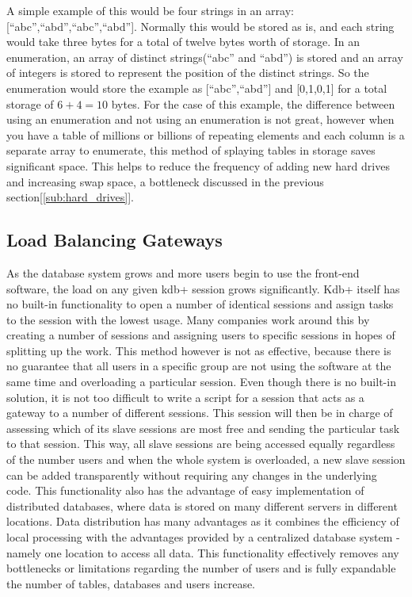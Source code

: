 A simple example of this would be four strings in an array: [``abc'',``abd'',``abc'',``abd''].  Normally this would be stored as is, and each string would take three bytes for a total of twelve bytes worth of storage.  In an enumeration, an array of distinct strings(``abc'' and ``abd'') is stored and an array of integers is stored to represent the position of the distinct strings.  So the enumeration would store the example as [``abc'',``abd''] and [0,1,0,1] for a total storage of $6+4=10$ bytes.  For the case of this example, the difference between using an enumeration and not using an enumeration is not great, however when you have a table of millions or billions of repeating elements and each column is a separate array to enumerate, this method of splaying tables in storage saves significant space.  This helps to reduce the frequency of adding new hard drives and increasing swap space, a bottleneck discussed in the previous section[\ref{sub:hard_drives}].\newline

\subsection{Load Balancing Gateways} %
\label{sub:load_balancing}
As the database system grows and more users begin to use the front-end software, the load on any given kdb+ session grows significantly.  Kdb+ itself has no built-in functionality to open a number of identical sessions and assign tasks to the session with the lowest usage.  Many companies work around this by creating a number of sessions and assigning users to specific sessions in hopes of splitting up the work.  This method however is not as effective, because there is no guarantee that all users in a specific group are not using the software at the same time and overloading a particular session.  Even though there is no built-in solution, it is not too difficult to write a script for a session that acts as a gateway to a number of different sessions.  This session will then be in charge of assessing which of its slave sessions are most free and sending the particular task to that session.  This way, all slave sessions are being accessed equally regardless of the number users and when the whole system is overloaded, a new slave session can be added transparently without requiring any changes in the underlying code. This functionality also has the advantage of easy implementation of distributed databases, where data is stored on many different servers in different locations.  Data distribution has many advantages as it combines the efficiency of local processing with the advantages provided by a centralized database system - namely one location to access all data\cite{Kroha}. This functionality effectively removes any bottlenecks or limitations regarding the number of users and is fully expandable the number of tables, databases and users increase.\newline

